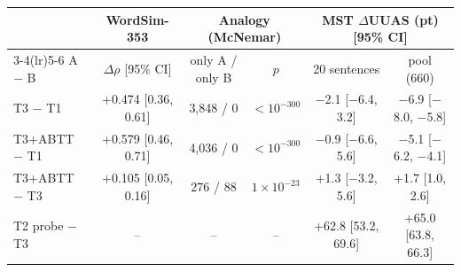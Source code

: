 \begin{tabular}{lccccc}
\toprule
 & WordSim-353 & \multicolumn{2}{c}{Analogy (McNemar)} & \multicolumn{2}{c}{MST $\Delta$UUAS (pt) [95\% CI]} \\
\cmidrule(lr){3-4}\cmidrule(lr){5-6}
A $-$ B & $\Delta\rho$ [95\% CI] & only A / only B & $p$ & 20 sentences & pool (660) \\
\midrule
T3 $-$ T1 & +0.474 [0.36, 0.61] & 3,848 / 0 & $<10^{-300}$ & $-$2.1 [$-$6.4, 3.2] & $-$6.9 [$-$8.0, $-$5.8] \\
T3+ABTT $-$ T1 & +0.579 [0.46, 0.71] & 4,036 / 0 & $<10^{-300}$ & $-$0.9 [$-$6.6, 5.6] & $-$5.1 [$-$6.2, $-$4.1] \\
T3+ABTT $-$ T3 & +0.105 [0.05, 0.16] & 276 / 88 & $1\times10^{-23}$ & +1.3 [$-$3.2, 5.6] & +1.7 [1.0, 2.6] \\
T2 probe $-$ T3 & -- & -- & -- & +62.8 [53.2, 69.6] & +65.0 [63.8, 66.3] \\
\bottomrule
\end{tabular}

